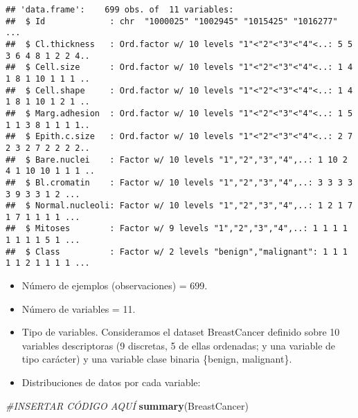 \documentclass[
]{article}
\newenvironment{Shaded}{\begin{snugshade}}{\end{snugshade}}
\newcommand{\CommentTok}[1]{\textcolor[rgb]{0.56,0.35,0.01}{\textit{#1}}}
\newcommand{\KeywordTok}[1]{\textcolor[rgb]{0.13,0.29,0.53}{\textbf{#1}}}
\newcommand{\NormalTok}[1]{#1}
\begin{document}
\begin{verbatim}
## 'data.frame':    699 obs. of  11 variables:
##  $ Id             : chr  "1000025" "1002945" "1015425" "1016277" ...
##  $ Cl.thickness   : Ord.factor w/ 10 levels "1"<"2"<"3"<"4"<..: 5 5 3 6 4 8 1 2 2 4..
##  $ Cell.size      : Ord.factor w/ 10 levels "1"<"2"<"3"<"4"<..: 1 4 1 8 1 10 1 1 1 ..
##  $ Cell.shape     : Ord.factor w/ 10 levels "1"<"2"<"3"<"4"<..: 1 4 1 8 1 10 1 2 1 ..
##  $ Marg.adhesion  : Ord.factor w/ 10 levels "1"<"2"<"3"<"4"<..: 1 5 1 1 3 8 1 1 1 1..
##  $ Epith.c.size   : Ord.factor w/ 10 levels "1"<"2"<"3"<"4"<..: 2 7 2 3 2 7 2 2 2 2..
##  $ Bare.nuclei    : Factor w/ 10 levels "1","2","3","4",..: 1 10 2 4 1 10 10 1 1 1 ..
##  $ Bl.cromatin    : Factor w/ 10 levels "1","2","3","4",..: 3 3 3 3 3 9 3 3 1 2 ...
##  $ Normal.nucleoli: Factor w/ 10 levels "1","2","3","4",..: 1 2 1 7 1 7 1 1 1 1 ...
##  $ Mitoses        : Factor w/ 9 levels "1","2","3","4",..: 1 1 1 1 1 1 1 1 5 1 ...
##  $ Class          : Factor w/ 2 levels "benign","malignant": 1 1 1 1 1 2 1 1 1 1 ...
\end{verbatim}

\begin{itemize}
\item
  Número de ejemplos (observaciones) = 699.
\item
  Número de variables = 11.
\item
  Tipo de variables. Consideramos el dataset BreastCancer definido sobre
  10 variables descriptoras (9 discretas, 5 de ellas ordenadas; y una
  variable de tipo carácter) y una variable clase binaria \{benign,
  malignant\}.
\item
  Distribuciones de datos por cada variable:
\end{itemize}

\begin{Shaded}
\begin{Highlighting}[]
\CommentTok{#INSERTAR CÓDIGO AQUÍ}
\KeywordTok{summary}\NormalTok{(BreastCancer)}
\end{Highlighting}
\end{Shaded}
\end{document}
